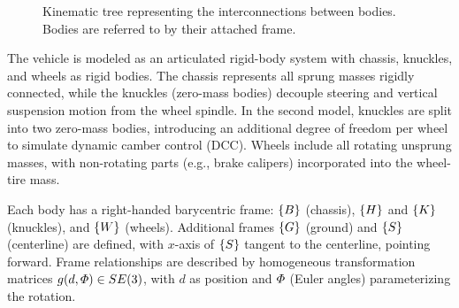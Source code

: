 \begin{figure}[b]
	\caption{Kinematic tree representing the interconnections between bodies. Bodies are referred to by their attached frame.}
	\label{fig:tree}
\end{figure}
The vehicle is modeled as an articulated rigid-body system with chassis, knuckles, and wheels as rigid bodies. The chassis represents all sprung masses rigidly connected, while the knuckles (zero-mass bodies) decouple steering and vertical suspension motion from the wheel spindle. In the second model, knuckles are split into two zero-mass bodies, introducing an additional degree of freedom per wheel to simulate dynamic camber control (DCC). Wheels include all rotating unsprung masses, with non-rotating parts (e.g., brake calipers) incorporated into the wheel-tire mass.

Each body has a right-handed barycentric frame: $\left\{B\right\}$ (chassis), $\left\{H\right\}$ and $\left\{K\right\}$ (knuckles), and $\left\{W\right\}$ (wheels). Additional frames $\left\{G\right\}$ (ground) and $\left\{S\right\}$ (centerline) are defined, with \(x\)-axis of $\left\{S\right\}$ tangent to the centerline, pointing forward. Frame relationships are described by homogeneous transformation matrices $ g(d, \varPhi) \in SE(3) $, with $ d $ as position and \(\varPhi\) (Euler angles) parameterizing the rotation.

